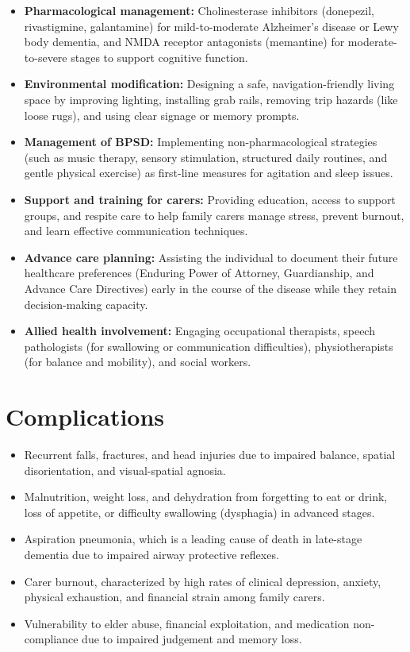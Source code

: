 \begin{itemize}
    \item \textbf{Pharmacological management:} Cholinesterase inhibitors (donepezil, rivastigmine, galantamine) for mild-to-moderate Alzheimer's disease or Lewy body dementia, and NMDA receptor antagonists (memantine) for moderate-to-severe stages to support cognitive function.
    \item \textbf{Environmental modification:} Designing a safe, navigation-friendly living space by improving lighting, installing grab rails, removing trip hazards (like loose rugs), and using clear signage or memory prompts.
    \item \textbf{Management of BPSD:} Implementing non-pharmacological strategies (such as music therapy, sensory stimulation, structured daily routines, and gentle physical exercise) as first-line measures for agitation and sleep issues.
    \item \textbf{Support and training for carers:} Providing education, access to support groups, and respite care to help family carers manage stress, prevent burnout, and learn effective communication techniques.
    \item \textbf{Advance care planning:} Assisting the individual to document their future healthcare preferences (Enduring Power of Attorney, Guardianship, and Advance Care Directives) early in the course of the disease while they retain decision-making capacity.
    \item \textbf{Allied health involvement:} Engaging occupational therapists, speech pathologists (for swallowing or communication difficulties), physiotherapists (for balance and mobility), and social workers.
\end{itemize}

\section*{Complications}
\begin{itemize}
    \item Recurrent falls, fractures, and head injuries due to impaired balance, spatial disorientation, and visual-spatial agnosia.
    \item Malnutrition, weight loss, and dehydration from forgetting to eat or drink, loss of appetite, or difficulty swallowing (dysphagia) in advanced stages.
    \item Aspiration pneumonia, which is a leading cause of death in late-stage dementia due to impaired airway protective reflexes.
    \item Carer burnout, characterized by high rates of clinical depression, anxiety, physical exhaustion, and financial strain among family carers.
    \item Vulnerability to elder abuse, financial exploitation, and medication non-compliance due to impaired judgement and memory loss.
\end{itemize}

